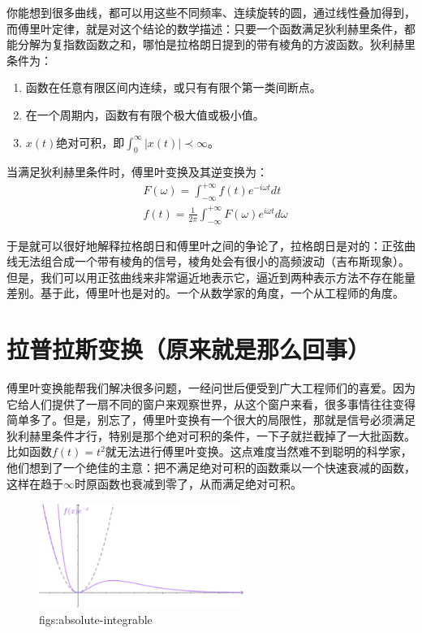 \documentclass[lang=cn,11pt,a4paper,cite=numbers]{elegantpaper}
\begin{document}
  你能想到很多曲线，都可以用这些不同频率、连续旋转的圆，通过线性叠加得到，而傅里叶定律，就是对这个结论的数学描述：只要一个函数满足狄利赫里条件，都能分解为复指数函数之和，哪怕是拉格朗日提到的带有棱角的方波函数。狄利赫里条件为：
\begin{enumerate}
  \item 函数在任意有限区间内连续，或只有有限个第一类间断点。
  \item 在一个周期内，函数有有限个极大值或极小值。
  \item $x(t)$绝对可积，即$\int_{0}^{\infty}\left|x(t)\right|\prec\infty$。
\end{enumerate}

  当满足狄利赫里条件时，傅里叶变换及其逆变换为：
\begin{equation}
  \begin{aligned}
    &F(\omega)=\int_{-\infty}^{+\infty}f(t)e^{-i{\omega}t}dt\\
    &f(t)=\frac{1}{2\pi}\int_{-\infty}^{+\infty}F(\omega)e^{i{\omega}t}d\omega
  \end{aligned}
\end{equation}

  于是就可以很好地解释拉格朗日和傅里叶之间的争论了，拉格朗日是对的：正弦曲线无法组合成一个带有棱角的信号，棱角处会有很小的高频波动（吉布斯现象）。但是，我们可以用正弦曲线来非常逼近地表示它，逼近到两种表示方法不存在能量差别。基于此，傅里叶也是对的。一个从数学家的角度，一个从工程师的角度。

\section{拉普拉斯变换（原来就是那么回事）}
  傅里叶变换能帮我们解决很多问题，一经问世后便受到广大工程师们的喜爱。因为它给人们提供了一扇不同的窗户来观察世界，从这个窗户来看，很多事情往往变得简单多了。但是，别忘了，傅里叶变换有一个很大的局限性，那就是信号必须满足狄利赫里条件才行，特别是那个绝对可积的条件，一下子就拦截掉了一大批函数。比如函数$f(t)=t^{2}$就无法进行傅里叶变换。这点难度当然难不到聪明的科学家，他们想到了一个绝佳的主意：把不满足绝对可积的函数乘以一个快速衰减的函数，这样在趋于$\infty$时原函数也衰减到零了，从而满足绝对可积。
\begin{figure}[!htb]
  \centering
  \includegraphics[width=0.6\textwidth]{figs/absolute-integrable.png}
  \caption{figs:absolute-integrable}
  \label{figs:absolute-integrable}
\end{figure}
\end{document}
